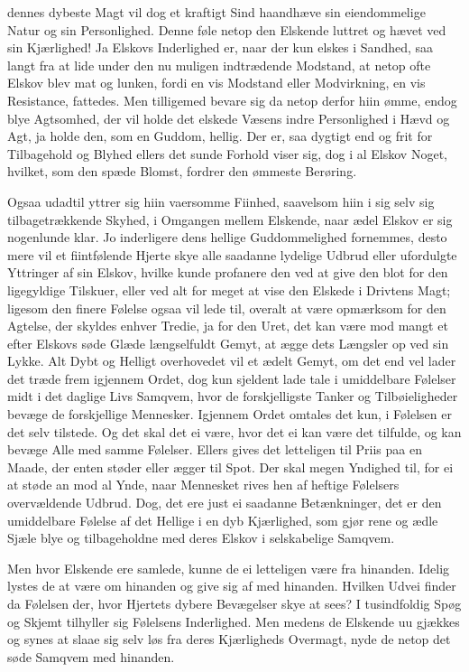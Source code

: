 \documentclass[12pt,a4paper]{book}
\newcommand{\apage}[1]{\marginnote{\footnotesize\textit{[#1]}}}
\begin{document}
dennes dybeste Magt vil dog et kraftigt Sind haandhæve sin eiendommelige
Natur og sin Personlighed. Denne føle netop den Elskende luttret og
hævet ved sin Kjærlighed! Ja Elskovs Inderlighed er, naar der kun elskes
i Sandhed, saa langt fra at lide under den nu muligen indtrædende
Modstand, at netop ofte Elskov blev mat og lunken, fordi en vis Modstand
eller Modvirkning, en vis Resistance, fattedes. Men tilligemed bevare
sig da netop derfor hiin ømme, endog blye Agtsomhed, der vil holde det
elskede Væsens indre Personlighed i Hævd og Agt, ja holde den, som en
Guddom, hellig. Der er, saa dygtigt end og frit for Tilbagehold og
Blyhed ellers det sunde Forhold viser sig, dog i al Elskov Noget,
hvilket, som den spæde Blomst, fordrer den ømmeste Berøring.

Ogsaa udadtil yttrer sig hiin vaersomme Fiinhed, saavelsom hiin i sig
selv sig tilbagetrækkende Skyhed, i Omgangen mellem Elskende, naar ædel
Elskov er sig nogenlunde klar. Jo inderligere dens hellige
Guddommelighed fornemmes, desto mere vil et fiintfølende Hjerte skye
alle saadanne lydelige Udbrud eller ufordulgte Yttringer af sin Elskov,
hvilke kunde profanere den ved at give den blot for den ligegyldige
Tilskuer, eller ved alt for meget at vise den Elskede i Drivtens Magt;
ligesom den finere Følelse ogsaa vil lede til, overalt at være
opmærksom for den Agtelse, der skyldes enhver Tredie, ja for den Uret,
det kan være mod mangt et \apage{50} efter Elskovs søde Glæde længselfuldt Gemyt,
at ægge dets Længsler op ved sin Lykke. Alt Dybt og Helligt overhovedet
vil et ædelt Gemyt, om det end vel lader det træde frem igjennem Ordet,
dog kun sjeldent lade tale i umiddelbare Følelser midt i det daglige
Livs Samqvem, hvor de forskjelligste Tanker og Tilbøieligheder bevæge de
forskjellige Mennesker. Igjennem Ordet omtales det kun, i Følelsen er
det selv tilstede. Og det skal det ei være, hvor det ei kan være det
tilfulde, og kan bevæge Alle med samme Følelser. Ellers gives det
letteligen til Priis paa en Maade, der enten støder eller ægger til
Spot. Der skal megen Yndighed til, for ei at støde an mod al Ynde, naar
Mennesket rives hen af heftige Følelsers overvældende Udbrud. Dog, det
ere just ei saadanne Betænkninger, det er den umiddelbare Følelse af det
Hellige i en dyb Kjærlighed, som gjør rene og ædle Sjæle blye og
tilbageholdne med deres Elskov i selskabelige Samqvem.

Men hvor Elskende ere samlede, kunne de ei letteligen være fra
hinanden. Idelig lystes de at være om hinanden og give sig af med
hinanden. Hvilken Udvei finder da Følelsen der, hvor Hjertets dybere
Bevægelser skye at sees? I tusindfoldig Spøg og Skjemt tilhyller sig
Følelsens Inderlighed. Men medens de Elskende uu gjækkes og synes at
slaae sig selv løs fra deres Kjærligheds Overmagt, nyde de netop det
søde Samqvem med hinanden. 
\end{document}
